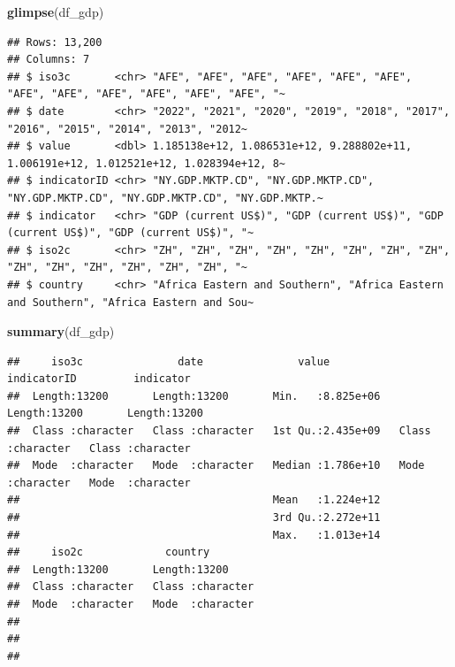 \documentclass[
  12pt,
  oneside]{book}
\newenvironment{Shaded}{\begin{snugshade}}{\end{snugshade}}
\newcommand{\FunctionTok}[1]{\textcolor[rgb]{0.13,0.29,0.53}{\textbf{#1}}}
\newcommand{\NormalTok}[1]{#1}
\begin{document}
\begin{Shaded}
\begin{Highlighting}[]
\FunctionTok{glimpse}\NormalTok{(df\_gdp)}
\end{Highlighting}
\end{Shaded}

\begin{verbatim}
## Rows: 13,200
## Columns: 7
## $ iso3c       <chr> "AFE", "AFE", "AFE", "AFE", "AFE", "AFE", "AFE", "AFE", "AFE", "AFE", "AFE", "AFE", "~
## $ date        <chr> "2022", "2021", "2020", "2019", "2018", "2017", "2016", "2015", "2014", "2013", "2012~
## $ value       <dbl> 1.185138e+12, 1.086531e+12, 9.288802e+11, 1.006191e+12, 1.012521e+12, 1.028394e+12, 8~
## $ indicatorID <chr> "NY.GDP.MKTP.CD", "NY.GDP.MKTP.CD", "NY.GDP.MKTP.CD", "NY.GDP.MKTP.CD", "NY.GDP.MKTP.~
## $ indicator   <chr> "GDP (current US$)", "GDP (current US$)", "GDP (current US$)", "GDP (current US$)", "~
## $ iso2c       <chr> "ZH", "ZH", "ZH", "ZH", "ZH", "ZH", "ZH", "ZH", "ZH", "ZH", "ZH", "ZH", "ZH", "ZH", "~
## $ country     <chr> "Africa Eastern and Southern", "Africa Eastern and Southern", "Africa Eastern and Sou~
\end{verbatim}

\begin{Shaded}
\begin{Highlighting}[]
\FunctionTok{summary}\NormalTok{(df\_gdp)}
\end{Highlighting}
\end{Shaded}

\begin{verbatim}
##     iso3c               date               value           indicatorID         indicator        
##  Length:13200       Length:13200       Min.   :8.825e+06   Length:13200       Length:13200      
##  Class :character   Class :character   1st Qu.:2.435e+09   Class :character   Class :character  
##  Mode  :character   Mode  :character   Median :1.786e+10   Mode  :character   Mode  :character  
##                                        Mean   :1.224e+12                                        
##                                        3rd Qu.:2.272e+11                                        
##                                        Max.   :1.013e+14                                        
##     iso2c             country         
##  Length:13200       Length:13200      
##  Class :character   Class :character  
##  Mode  :character   Mode  :character  
##                                       
##                                       
## 
\end{verbatim}
\end{document}
